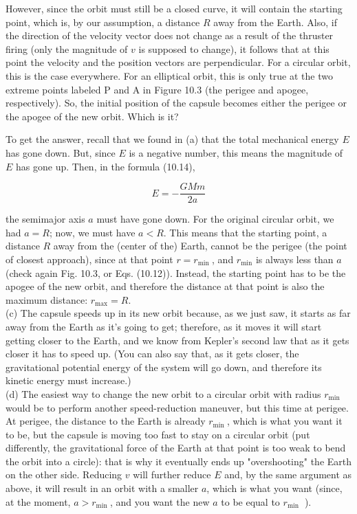 \documentclass[10pt]{article}
\begin{document}
However, since the orbit must still be a closed curve, it will contain the starting point, which is, by our assumption, a distance $R$ away from the Earth. Also, if the direction of the velocity vector does not change as a result of the thruster firing (only the magnitude of $v$ is supposed to change), it follows that at this point the velocity and the position vectors are perpendicular. For a circular orbit, this is the case everywhere. For an elliptical orbit, this is only true at the two extreme points labeled P and A in Figure 10.3 (the perigee and apogee, respectively). So, the initial position of the capsule becomes either the perigee or the apogee of the new orbit. Which is it?

To get the answer, recall that we found in (a) that the total mechanical energy $E$ has gone down. But, since $E$ is a negative number, this means the magnitude of $E$ has gone up. Then, in the formula (10.14),

$$
E=-\frac{G M m}{2 a}
$$

the semimajor axis $a$ must have gone down. For the original circular orbit, we had $a=R$; now, we must have $a<R$. This means that the starting point, a distance $R$ away from the (center of the) Earth, cannot be the perigee (the point of closest approach), since at that point $r=r_{\text {min }}$, and $r_{\min }$ is always less than $a$ (check again Fig. 10.3, or Eqs. (10.12)). Instead, the starting point has to be the apogee of the new orbit, and therefore the distance at that point is also the maximum distance: $r_{\max }=R$.\\
(c) The capsule speeds up in its new orbit because, as we just saw, it starts as far away from the Earth as it's going to get; therefore, as it moves it will start getting closer to the Earth, and we know from Kepler's second law that as it gets closer it has to speed up. (You can also say that, as it gets closer, the gravitational potential energy of the system will go down, and therefore its kinetic energy must increase.)\\
(d) The easiest way to change the new orbit to a circular orbit with radius $r_{\text {min }}$ would be to perform another speed-reduction maneuver, but this time at perigee. At perigee, the distance to the Earth is already $r_{\text {min }}$, which is what you want it to be, but the capsule is moving too fast to stay on a circular orbit (put differently, the gravitational force of the Earth at that point is too weak to bend the orbit into a circle): that is why it eventually ends up "overshooting" the Earth on the other side. Reducing $v$ will further reduce $E$ and, by the same argument as above, it will result in an orbit with a smaller $a$, which is what you want (since, at the moment, $a>r_{\text {min }}$, and you want the new $a$ to be equal to $r_{\text {min }}$ ).
\end{document}

